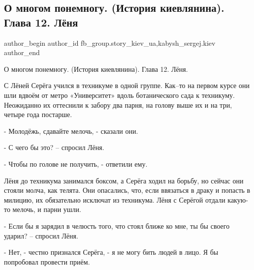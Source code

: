  
 
 
 
 
 
\subsection{О многом понемногу. (История киевлянина). Глава 12. Лёня}
\label{sec:26_12_2021.fb.fb_group.story_kiev_ua.2.istoria_kievljanina_glava_12_ljonja}
 
\ifcmt
 author_begin
   author_id fb_group.story_kiev_ua,kabysh_sergej.kiev
 author_end
\fi

О многом понемногу.  (История киевлянина).  Глава 12. Лёня.

С Лёней Серёга учился в техникуме в одной группе. Как–то на первом курсе они
шли вдвоём от метро «Университет» вдоль ботанического сада к техникуму.
Неожиданно их оттеснили к забору два парня, на голову выше их и на три, четыре
года постарше.


- Молодёжь, сдавайте мелочь, - сказали они.

- С чего бы это? – спросил Лёня.

- Чтобы по голове не получить, - ответили ему.

Лёня до техникума занимался боксом, а Серёга ходил на борьбу, но сейчас они
стояли молча, как телята. Они опасались, что, если ввязаться в драку и попасть
в милицию, их обязательно исключат из техникума. Лёня с Серёгой отдали какую-то
мелочь, и парни ушли.

- Если бы я зарядил в челюсть того, что стоял ближе ко мне, ты бы своего
ударил? – спросил Лёня.

- Нет, - честно признался Серёга, - я не могу бить людей в лицо. Я бы
попробовал провести приём.

